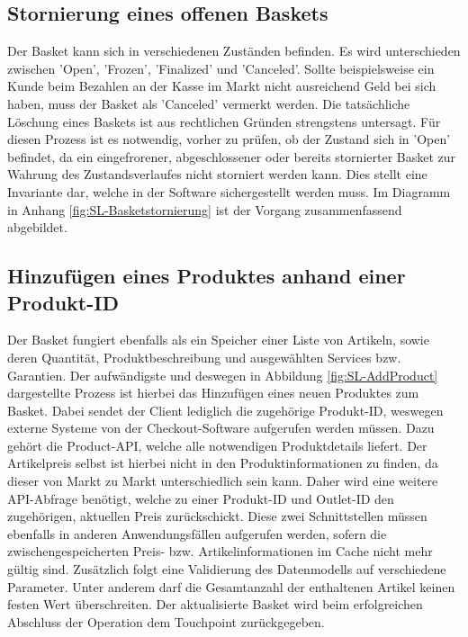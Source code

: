 \subsection{Stornierung eines offenen Baskets}

Der Basket kann sich in verschiedenen Zuständen befinden. Es wird unterschieden zwischen 'Open', 'Frozen', 'Finalized' und 'Canceled'. Sollte beispielsweise ein Kunde beim Bezahlen an der Kasse im Markt nicht ausreichend Geld bei sich haben, muss der Basket als 'Canceled' vermerkt werden. Die tatsächliche Löschung eines Baskets ist aus rechtlichen Gründen strengstens untersagt. Für diesen Prozess ist es notwendig, vorher zu prüfen, ob der Zustand sich in 'Open' befindet, da ein eingefrorener, abgeschlossener oder bereits stornierter Basket zur Wahrung des Zustandsverlaufes nicht storniert werden kann. Dies stellt eine Invariante dar, welche in der Software sichergestellt werden muss. Im Diagramm in Anhang \ref{fig:SL-Basketstornierung} ist der Vorgang zusammenfassend abgebildet.


\subsection{Hinzufügen eines Produktes anhand einer Produkt-ID}

Der Basket fungiert ebenfalls als ein Speicher einer Liste von Artikeln, sowie deren Quantität, Produktbeschreibung und ausgewählten Services bzw. Garantien. Der aufwändigste und deswegen in Abbildung \ref{fig:SL-AddProduct} dargestellte Prozess ist hierbei das Hinzufügen eines neuen Produktes zum Basket. Dabei sendet der Client lediglich die zugehörige Produkt-ID, weswegen externe Systeme von der Checkout-Software aufgerufen werden müssen. Dazu gehört die Product-API, welche alle notwendigen Produktdetails liefert. Der Artikelpreis selbst ist hierbei nicht in den Produktinformationen zu finden, da dieser von Markt zu Markt unterschiedlich sein kann. Daher wird eine weitere API-Abfrage benötigt, welche zu einer Produkt-ID und Outlet-ID den zugehörigen, aktuellen Preis zurückschickt. Diese zwei Schnittstellen müssen ebenfalls in anderen Anwendungsfällen aufgerufen werden, sofern die zwischengespeicherten Preis- bzw. Artikelinformationen im Cache nicht mehr gültig sind. Zusätzlich folgt eine Validierung des Datenmodells auf verschiedene Parameter. Unter anderem darf die Gesamtanzahl der enthaltenen Artikel keinen festen Wert überschreiten. Der aktualisierte Basket wird beim erfolgreichen Abschluss der Operation dem Touchpoint zurückgegeben.

